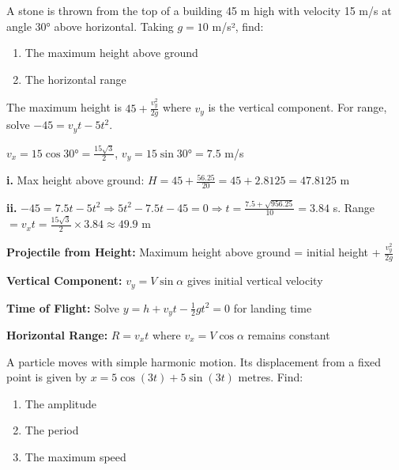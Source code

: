 \begin{problem}
A stone is thrown from the top of a building 45 m high with velocity 15 m/s at angle $30°$ above horizontal. Taking $g = 10$ m/s², find:
\begin{enumerate}[label=\textbf{\roman*.}]
    \item The maximum height above ground
    \item The horizontal range
\end{enumerate}
\end{problem}

\begin{hint}
The maximum height is $45 + \frac{v_y^2}{2g}$ where $v_y$ is the vertical component. For range, solve $-45 = v_y t - 5t^2$.
\end{hint}

\begin{solution}
$v_x = 15\cos 30° = \frac{15\sqrt{3}}{2}$, $v_y = 15\sin 30° = 7.5$ m/s

\textbf{i.} Max height above ground: $H = 45 + \frac{56.25}{20} = 45 + 2.8125 = 47.8125$ m

\textbf{ii.} $-45 = 7.5t - 5t^2 \Rightarrow 5t^2 - 7.5t - 45 = 0 \Rightarrow t = \frac{7.5 + \sqrt{956.25}}{10} = 3.84$ s. Range $= v_x t = \frac{15\sqrt{3}}{2} \times 3.84 \approx 49.9$ m
\end{solution}

\begin{takeaways}
\item \textbf{Projectile from Height:} Maximum height above ground = initial height + $\frac{v_y^2}{2g}$
\item \textbf{Vertical Component:} $v_y = V\sin\alpha$ gives initial vertical velocity
\item \textbf{Time of Flight:} Solve $y = h + v_y t - \frac{1}{2}gt^2 = 0$ for landing time
\item \textbf{Horizontal Range:} $R = v_x t$ where $v_x = V\cos\alpha$ remains constant
\end{takeaways}

\begin{problem}
A particle moves with simple harmonic motion. Its displacement from a fixed point is given by $x = 5\cos(3t) + 5\sin(3t)$ metres. Find:
\begin{enumerate}[label=\textbf{\roman*.}]
    \item The amplitude
    \item The period
    \item The maximum speed
\end{enumerate}
\end{problem}

